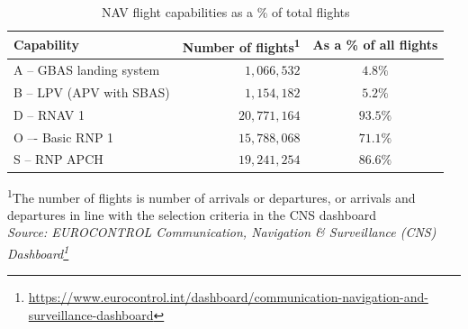 \documentclass[
  11pt,
  a4paper,
]{book}
\DeclareRobustCommand{\href}[2]{#2\footnote{\url{#1}}}
\begin{document}
\hypertarget{tbl-nav-flight}{}
\setlength{\LTpost}{0mm}
\begin{longtable}{lrc}
\caption{\label{tbl-nav-flight}NAV flight capabilities as a \% of total flights }\tabularnewline

\toprule
Capability & Number of flights\textsuperscript{1} & As a \% of all flights \\ 
\midrule
A – GBAS landing system & $1,066,532$ & $4.8\%$ \\ 
B – LPV (APV with SBAS) & $1,154,182$ & $5.2\%$ \\ 
D – RNAV 1 & $20,771,164$ & $93.5\%$ \\ 
O –- Basic RNP 1 & $15,788,068$ & $71.1\%$ \\ 
S – RNP APCH & $19,241,254$ & $86.6\%$ \\ 
\bottomrule
\end{longtable}
\begin{minipage}{\linewidth}
\textsuperscript{1}The number of flights is number of arrivals or departures, or arrivals and departures in line with the selection criteria in the CNS dashboard\\
\emph{Source: \href{https://www.eurocontrol.int/dashboard/communication-navigation-and-surveillance-dashboard}{EUROCONTROL Communication, Navigation \& Surveillance (CNS) Dashboard}}\\
\end{minipage}
\end{document}
